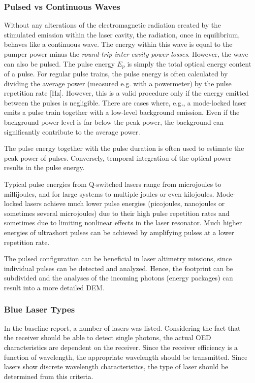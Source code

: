 	\subsubsection{Pulsed vs Continuous Waves}
Without any alterations of the electromagnetic radiation created by the stimulated emission within the \acs{laser} cavity, the radiation, once in equilibrium, behaves like a continuous wave. The energy within this wave is equal to the pumper power minus the \textit{round-trip inter cavity power losses}. However, the wave can also be pulsed. The pulse energy $E_{p}$ is simply the total optical energy content of a pulse. For regular pulse trains, the pulse energy is often calculated by dividing the average power (measured e.g. with a powermeter) by the pulse repetition rate [Hz]. However, this is a valid procedure only if the energy emitted between the pulses is negligible. There are cases where, e.g., a mode-locked laser emits a pulse train together with a low-level background emission. Even if the background power level is far below the peak power, the background can significantly contribute to the average power. 

The pulse energy together with the pulse duration is often used to estimate the peak power of pulses. Conversely, temporal integration of the optical power results in the pulse energy.

Typical pulse energies from Q-switched lasers range from microjoules to millijoules, and for large systems to multiple joules or even kilojoules. Mode-locked lasers achieve much lower pulse energies (picojoules, nanojoules or sometimes several microjoules) due to their high pulse repetition rates and sometimes due to limiting nonlinear effects in the laser resonator. Much higher energies of ultrashort pulses can be achieved by amplifying pulses at a lower repetition rate.

The pulsed configuration can be beneficial in \acs{laser} altimetry missions, since individual pulses can be detected and analyzed. Hence, the footprint can be subdivided and the analyses of the incoming photons (energy packages) can result into a more detailed \acs{DEM}.  

	\subsubsection{Blue Laser Types}
In the baseline report, a number of \acs{laser}s was listed. Considering the fact that the receiver should be able to detect single photons, the actual \acs{OED} characteristics are dependent on the receiver. Since the receiver efficiency is a function of wavelength, the appropriate wavelength should be transmitted. Since \acs{laser}s show discrete wavelength characteristics, the type of \acs{laser} should be determined from this criteria.

